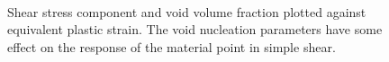 \begin{figure}[htbp]
  \begin{center}
    ~ 
    \caption{Shear stress component and void volume fraction plotted
      against equivalent plastic strain. The void nucleation
      parameters have some effect on the response of the
      material point in simple shear.}
    \label{fig:shear-nuc}
  \end{center}
\end{figure}


